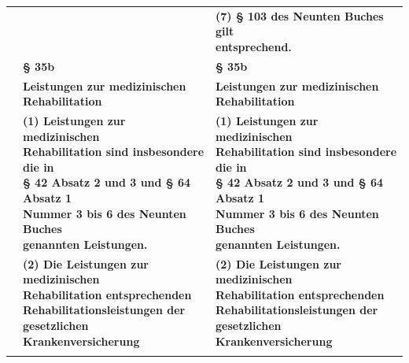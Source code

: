\documentclass[10pt,a4paper,landscape]{article}
\begin{document}
\begin{longtable}{|L{8.2cm}|L{8.2cm}|L{8.2cm}|}
\hhline{|---|}
 &  & \textbf{\textcolor{diffgreen}{(7) \S{} 103 des Neunten Buches gilt  \newline entsprechend.}} \\
\hhline{|---|}
 & \textbf{\S{} 35b } & \textbf{\S{} 35b } \\
\hhline{|---|}
 & \textbf{Leistungen zur medizinischen  \newline Rehabilitation} & \textbf{Leistungen zur medizinischen  \newline Rehabilitation} \\
\hhline{|---|}
 & \textbf{(1) Leistungen zur medizinischen  \newline Rehabilitation sind insbesondere die in  \newline \S{} 42 Absatz 2 und 3 und \S{} 64 Absatz 1  \newline Nummer 3 bis 6 des Neunten Buches  \newline genannten Leistungen. } & \textbf{(1) Leistungen zur medizinischen  \newline Rehabilitation sind insbesondere die in  \newline \S{} 42 Absatz 2 und 3 und \S{} 64 Absatz 1  \newline Nummer 3 bis 6 des Neunten Buches  \newline genannten Leistungen. } \\
\hhline{|---|}
 & \textbf{(2) Die Leistungen zur medizinischen  \newline Rehabilitation entsprechenden  \newline Rehabilitationsleistungen der  \newline gesetzlichen Krankenversicherung } & \textbf{(2) Die Leistungen zur medizinischen  \newline Rehabilitation entsprechenden  \newline Rehabilitationsleistungen der  \newline gesetzlichen Krankenversicherung } \\
\hhline{|---|}

\end{longtable}
\end{document}
